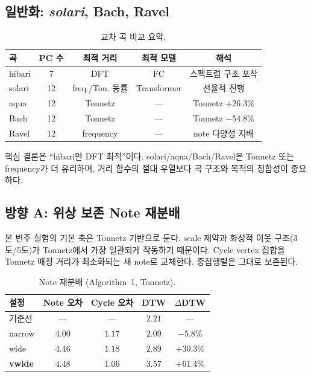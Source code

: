 \documentclass[11pt,a4paper]{article}
\begin{document}
\subsection{일반화: \emph{solari}, Bach, Ravel}
\label{subsec:generalization}

\begin{table}[H]
\centering
\caption{교차 곡 비교 요약.}
\label{tab:generalization}
\begin{tabular}{lcccc}
\toprule
곡 & PC 수 & 최적 거리 & 최적 모델 & 해석 \\
\midrule
hibari & 7 & DFT & FC & 스펙트럼 구조 포착 \\
solari & 12 & freq./Ton. 동률 & Transformer & 선율적 진행 \\
aqua   & 12 & Tonnetz & --- & Tonnetz $+26.3\%$ \\
Bach   & 12 & Tonnetz & --- & Tonnetz $-54.8\%$ \\
Ravel  & 12 & frequency & --- & note 다양성 지배 \\
\bottomrule
\end{tabular}
\end{table}

핵심 결론은 ``hibari만 DFT 최적''이다.
solari/aqua/Bach/Ravel은 Tonnetz 또는 frequency가 더 유리하며,
거리 함수의 절대 우열보다 곡 구조와 목적의 정합성이 중요하다.

\subsection{방향 A: 위상 보존 Note 재분배}
\label{subsec:dirA}

본 변주 실험의 기본 축은 Tonnetz 기반으로 둔다. scale 제약과
화성적 이웃 구조(3도/5도)가 Tonnetz에서 가장 일관되게 작동하기 때문이다.
Cycle vertex 집합을 Tonnetz 매칭 거리가 최소화되는 새 note로
교체한다. 중첩행렬은 그대로 보존된다.

\begin{table}[H]
\centering
\caption{Note 재분배 (Algorithm~1, Tonnetz).}
\label{tab:redistrib}
\begin{tabular}{lcccc}
\toprule
설정 & Note 오차 & Cycle 오차 & DTW & $\Delta$DTW \\
\midrule
기준선     & --- & --- & $2.21$ & --- \\
narrow    & $4.00$ & $1.17$ & $2.09$ & $-5.8\%$ \\
wide      & $4.46$ & $1.18$ & $2.89$ & $+30.3\%$ \\
\textbf{vwide} & $4.48$ & $1.06$ & $\mathbf{3.57}$ & $\mathbf{+61.4\%}$ \\
\bottomrule
\end{tabular}
\end{table}
\end{document}
